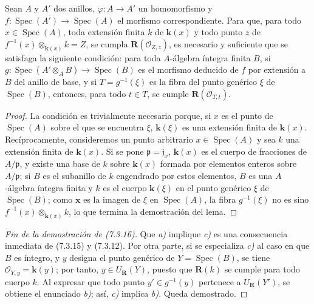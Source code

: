 \begin{lemma}[7.3.16.2]
\label{IV.2.s7.3.16.2-fr}
Sean $A$ y $A'$ dos anillos, $\varphi:A\to A'$ un homomorfismo y
$f:\operatorname{Spec}(A')\to\operatorname{Spec}(A)$ el morfismo
correspondiente. Para que, para todo $x\in\operatorname{Spec}(A)$,
toda
extensión finita $k$ de $\boldsymbol{k}(x)$ y todo punto $z$ de
$f^{-1}(x)\otimes_{\mathbf{k}(x)}k=Z$, se cumpla
$\boldsymbol R(\mathscr O_{Z,z})$, es necesario y suficiente que se
satisfaga la siguiente condición: para toda $A$-álgebra íntegra
finita $B$, si
$g:\operatorname{Spec}(A'\otimes_A B)\to\operatorname{Spec}(B)$ es
el morfismo deducido de $f$ por extensión a $B$ del anillo de base,
y si $T=g^{-1}(\xi)$ es la fibra del punto genérico $\xi$ de
$\operatorname{Spec}(B)$, entonces, para todo $t\in T$, se cumple
$\boldsymbol R(\mathscr O_{T,t})$.
\end{lemma}

\begin{proof}
La condición es trivialmente necesaria porque, si $x$ es el punto de
$\operatorname{Spec}(A)$ sobre el que se encuentra $\xi$, $\boldsymbol{k}(\xi)$
es una extensión finita de $\boldsymbol{k}(x)$. Recíprocamente, consideremos un
punto arbitrario $x\in\operatorname{Spec}(A)$ y sea $k$ una extensión
finita de $\boldsymbol{k}(x)$. Si se pone $\mathfrak p=\mathfrak j_x$, $\boldsymbol{k}(x)$ es
el cuerpo de fracciones de $A/\mathfrak p$, y existe una base de $k$
sobre $\boldsymbol{k}(x)$ formada por elementos enteros sobre $A/\mathfrak p$;
si $B$ es el subanillo de $k$ engendrado por estos elementos, $B$ es
una $A$-álgebra íntegra finita y $k$ es el cuerpo $\boldsymbol{k}(\xi)$ en el
punto genérico $\xi$ de $\operatorname{Spec}(B)$; como $\boldsymbol{x}$ es la
imagen de $\xi$ en $\operatorname{Spec}(A)$, la fibra
$g^{-1}(\xi)$ no es sino $f^{-1}(x)\otimes_{\mathbf{k}(x)}k$, lo que termina
la demostración del lema.
\end{proof}

\begin{proof}[Fin de la demostración de (7.3.16)]
Que \emph{a)} implique \emph{c)} es una consecuencia inmediata de (7.3.15) y
(7.3.12). Por otra parte, si se especializa \emph{c)} al caso en que $B$
es íntegro, y $y$ designa el punto genérico de
$Y=\operatorname{Spec}(B)$, se tiene $\mathscr O_{Y,y}=\boldsymbol{k}(y)$; por
tanto, $y\in U_{\mathbf{R}}(Y)$, puesto que $\boldsymbol R(k)$
se cumple para todo cuerpo $k$. Al expresar que todo punto
$y'\in g^{-1}(y)$ pertenece a $U_{\mathbf{R}}(Y')$, se obtiene el enunciado \emph{b)}; así, \emph{c)} implica \emph{b)}. Queda demostrado.
\end{proof}
